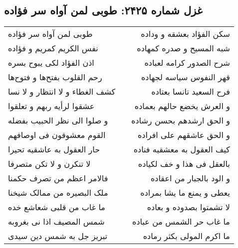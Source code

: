 \begin{center}
\section*{غزل شماره ۲۴۲۵: طوبی لمن آواه سر فؤاده}
\label{sec:2425}
\begin{longtable}{l p{0.5cm} r}
طوبی لمن آواه سر فؤاده
&&
سکن الفؤاد بعشقه و وداده
\\
نفس الکریم کمریم و فؤاده
&&
شبه المسیح و صدره کمهاده
\\
اذن الفؤاد لکی یبوح بسره
&&
شرح الصدور کرامه لعباده
\\
رحم القلوب بفتح‌ها و فتوح‌ها
&&
قهر النفوس سیاسه لجهاده
\\
کشف الغطاء و لا انتظار و لا نسا
&&
فرح السعید تانسا بعتاده
\\
عشقوا لرأیه ربهم و تعلقوا
&&
و العرش یخضع حالهم بعماده
\\
و صلوا الی نظر الحبیب بفضله
&&
و الحق ارشدهم بحسن رشاده
\\
القوم معشوقون فی اوصافهم
&&
و الحق عاشقهم علی افراده
\\
حار العقول به عاشقیه تحیرا
&&
کیف العقول به معشقیه فناده
\\
لا تنکرن و لا تکن متصرفا
&&
بالعقل فی هذا و خف لکیاده
\\
فالامر اعظم من تصرف حکمنا
&&
و الود بالجبار من اعقاده
\\
ملک البصیره من ممالک شیخنا
&&
یعطی و یمنع ما یشا بمراده
\\
ما غاب من قلبی شعاشع خده
&&
لا تشمتوا بصدوده و بعاده
\\
شمس المصیف اذا نی بغروبه
&&
ما غاب حر الشمس من عباده
\\
تبریز جل به شمس دین سیدی
&&
ما اکرم المولی بکثر رماده
\\
\end{longtable}
\end{center}
